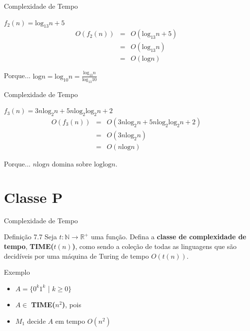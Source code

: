 \documentclass[xcolor=dvipsnames,table]{beamer}
\begin{document}
	\begin{frame}{Complexidade de Tempo}
		\begin{block}{$f_2 (n) = \mbox{log}_{13} n + 5$}
			\begin{eqnarray}
				O(f_2(n)) & = & O(\mbox{log}_{13} n + 5)\\
						  & = & O(\mbox{log}_{13} n)\\
						  & = & O(\mbox{log} n)
			\end{eqnarray}
		\end{block} 
		\begin{exampleblock}{Porque...}
			$\mbox{log} n = \mbox{log}_{10} n  = \frac{\mbox{log}_{13} n}{\mbox{log}_{13} 10}$
		\end{exampleblock}
	\end{frame}
	
	\begin{frame}{Complexidade de Tempo}
		\begin{block}{$f_3 (n) =  3n \mbox{log}_2 n + 5n \mbox{log}_2 \mbox{log}_2 n + 2$}
			\begin{eqnarray} 
				O(f_3(n)) & = & O(3n \mbox{log}_2 n + 5n \mbox{log}_2 \mbox{log}_2 n + 2)\\
						  & = & O(3n \mbox{log}_2 n)\\
						  & = & O(n \mbox{log} n)
			\end{eqnarray}
		\end{block} 
		\begin{exampleblock}{Porque...}
			$n \mbox{log} n$ domina sobre $\mbox{log} \mbox{log} n$.
		\end{exampleblock}
	\end{frame}
	
	\section{Classe P}
	\begin{frame}{Complexidade de Tempo}
		\begin{block}{Definição 7.7}
			Seja $t: \mathbb{N} \rightarrow \mathbb{R}^+$ uma função. Defina a {\bf classe de complexidade de tempo}, {\bf TIME($t(n)$)}, como sendo a coleção de todas as linguagens que são decidíveis por uma máquina de Turing de tempo $O(t(n))$.
		\end{block} \pause
		\begin{block}{Exemplo}
			\begin{itemize}
				\item $A = \{ 0^k 1^k$ | $k \geq 0 \}$
				\item $A \in$ {\bf TIME($n^2$)}, pois \pause
				\item $M_1$ decide $A$ em tempo $O(n^2)$
			\end{itemize}
		\end{block}
	\end{frame}
	
\end{document}
